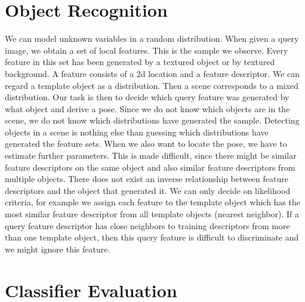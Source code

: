 
\section{Object Recognition}

We can model unknown variables in a random distribution. When given a query
image, we obtain a set of local features. This is the sample we observe. Every
feature in this set has been generated by a textured object or by textured
background. A feature consists of a 2d location and a feature descriptor. We
can regard a template object as a distribution. Then a scene corresponds to a
mixed distribution. Our task is then to decide which query feature was
generated by what object and derive a pose. Since we do not know which objects
are in the scene, we do not know which distributions have generated the sample.
Detecting objects in a scene is nothing else than guessing which distributions
have generated the feature sets. When we also want to locate the pose, we have
to estimate further parameters. This is made difficult, since there might be
similar feature descriptors on the same object and also similar feature
descriptors from multiple objects. There does not exist an inverse relationship
between feature descriptors and the object that generated it. We can only
decide on likelihood criteria, for example we assign each feature to the
template object which has the most similar feature descriptor from all template
objects (nearest neighbor). If a query feature descriptor has close neighbors
to training descriptors from more than one template object, then this query
feature is difficult to discriminate and we might ignore this feature.

\section{Classifier Evaluation}


